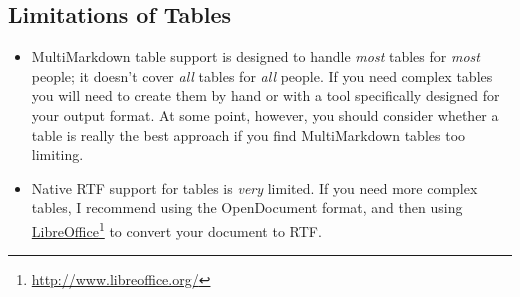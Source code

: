 \subsection{Limitations of Tables}
\label{limitationsoftables}

\begin{itemize}
\item MultiMarkdown table support is designed to handle \emph{most} tables for \emph{most} people; it doesn't cover \emph{all} tables for \emph{all} people. If you need complex tables you will need to create them by hand or with a tool specifically designed for your output format. At some point, however, you should consider whether a table is really the best approach if you find MultiMarkdown tables too limiting.

\item Native RTF support for tables is \emph{very} limited. If you need more complex tables, I recommend using the OpenDocument format, and then using \href{http://www.libreoffice.org/}{LibreOffice}\footnote{\href{http://www.libreoffice.org/}{http:\slash \slash www.libreoffice.org\slash }} to convert your document to RTF.

\end{itemize}



